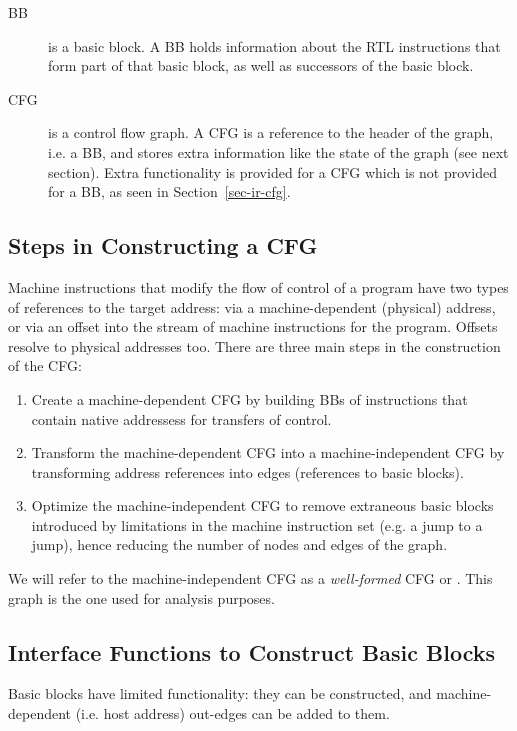 \begin{description}
\item [BB] is a basic block.  A BB holds information about the
    RTL instructions that form part of that basic block, as 
    well as successors of the basic block.

\item [CFG] is a control flow graph.  A CFG is a reference to 
    the header of the graph, i.e. a BB, and stores extra information
    like the state of the graph (see next section).
    Extra functionality is provided for a CFG which is not 
    provided for a BB, as seen in Section~\ref{sec-ir-cfg}.
\end{description}


\subsection{Steps in Constructing a CFG}
Machine instructions that modify the flow of control of a program 
have two types of references to the target address: via a machine-dependent
(physical) address, or via an offset into the stream of machine
instructions for the program.  Offsets resolve to physical 
addresses too.   
There are three main steps in the construction of the CFG:
\begin{enumerate}
\item Create a machine-dependent CFG by building BBs of instructions
    that contain native addressess for transfers of control.
\item Transform the machine-dependent CFG into a machine-independent
    CFG by transforming address references into edges (references
    to basic blocks).
\item Optimize the machine-independent CFG to remove extraneous 
    basic blocks introduced by limitations in the machine 
    instruction set (e.g. a jump to a jump), hence reducing the 
    number of nodes and edges of the graph. 
\end{enumerate} 

We will refer to the machine-independent CFG as a {\em well-formed} CFG
or \wfCFG.  This graph is the one used for analysis purposes. 


\subsection{Interface Functions to Construct Basic Blocks}
\label{sec-ir-bb}
Basic blocks have limited functionality: they can be 
constructed, and machine-dependent (i.e. host address) out-edges 
can be added to them. 

